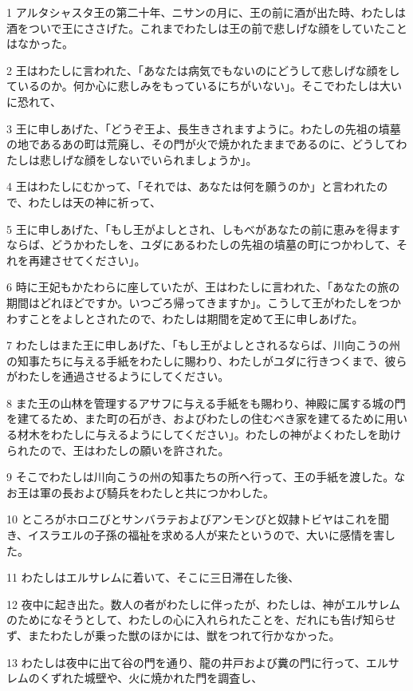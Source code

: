 \par 1 アルタシャスタ王の第二十年、ニサンの月に、王の前に酒が出た時、わたしは酒をついで王にささげた。これまでわたしは王の前で悲しげな顔をしていたことはなかった。
\par 2 王はわたしに言われた、「あなたは病気でもないのにどうして悲しげな顔をしているのか。何か心に悲しみをもっているにちがいない」。そこでわたしは大いに恐れて、
\par 3 王に申しあげた、「どうぞ王よ、長生きされますように。わたしの先祖の墳墓の地であるあの町は荒廃し、その門が火で焼かれたままであるのに、どうしてわたしは悲しげな顔をしないでいられましょうか」。
\par 4 王はわたしにむかって、「それでは、あなたは何を願うのか」と言われたので、わたしは天の神に祈って、
\par 5 王に申しあげた、「もし王がよしとされ、しもべがあなたの前に恵みを得ますならば、どうかわたしを、ユダにあるわたしの先祖の墳墓の町につかわして、それを再建させてください」。
\par 6 時に王妃もかたわらに座していたが、王はわたしに言われた、「あなたの旅の期間はどれほどですか。いつごろ帰ってきますか」。こうして王がわたしをつかわすことをよしとされたので、わたしは期間を定めて王に申しあげた。
\par 7 わたしはまた王に申しあげた、「もし王がよしとされるならば、川向こうの州の知事たちに与える手紙をわたしに賜わり、わたしがユダに行きつくまで、彼らがわたしを通過させるようにしてください。
\par 8 また王の山林を管理するアサフに与える手紙をも賜わり、神殿に属する城の門を建てるため、また町の石がき、およびわたしの住むべき家を建てるために用いる材木をわたしに与えるようにしてください」。わたしの神がよくわたしを助けられたので、王はわたしの願いを許された。
\par 9 そこでわたしは川向こうの州の知事たちの所へ行って、王の手紙を渡した。なお王は軍の長および騎兵をわたしと共につかわした。
\par 10 ところがホロニびとサンバラテおよびアンモンびと奴隷トビヤはこれを聞き、イスラエルの子孫の福祉を求める人が来たというので、大いに感情を害した。
\par 11 わたしはエルサレムに着いて、そこに三日滞在した後、
\par 12 夜中に起き出た。数人の者がわたしに伴ったが、わたしは、神がエルサレムのためになそうとして、わたしの心に入れられたことを、だれにも告げ知らせず、またわたしが乗った獣のほかには、獣をつれて行かなかった。
\par 13 わたしは夜中に出て谷の門を通り、龍の井戸および糞の門に行って、エルサレムのくずれた城壁や、火に焼かれた門を調査し、
